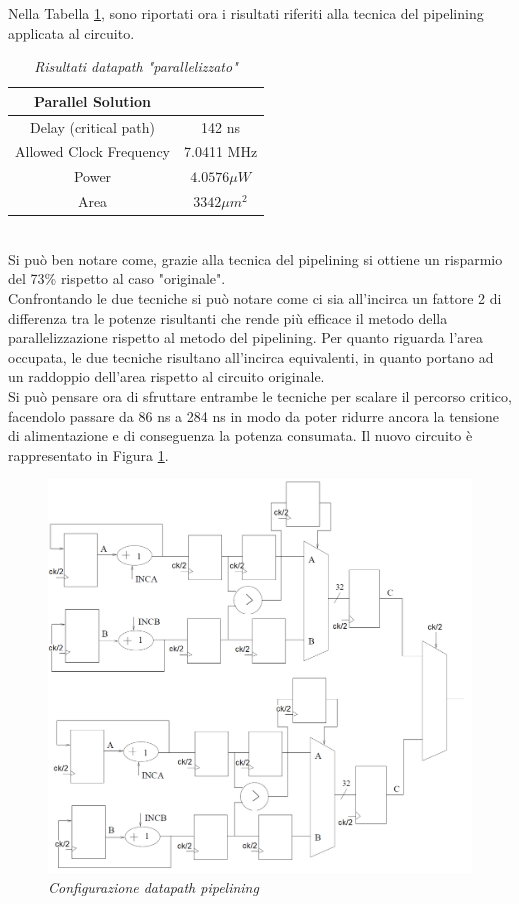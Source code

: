 Nella Tabella \ref{Tab33_6}, sono riportati ora i risultati riferiti alla tecnica del pipelining applicata al circuito.
\begin{table}[!h]\footnotesize
	\centering
	\begin{tabular}{|c|c|}
		\hline
		\textbf{Parallel Solution} & \\
		\hline
		Delay (critical path) & 142 ns\\
		Allowed Clock Frequency & 7.0411 MHz\\
		Power & $4.0576\mu W$\\
		Area & $3342 \mu m^{2}$\\
		\hline
	\end{tabular}
	\caption{\textit{Risultati datapath "parallelizzato"}}
	\label{Tab33_6}
\end{table}\\
Si può ben notare come, grazie alla tecnica del pipelining si ottiene un risparmio del 73\% rispetto al caso "originale".\\ Confrontando le due tecniche si può notare come ci sia all'incirca un fattore 2 di differenza tra le potenze risultanti che rende più efficace il metodo della parallelizzazione rispetto al metodo del pipelining. Per quanto riguarda l'area occupata, le due tecniche risultano all'incirca equivalenti, in quanto portano ad un raddoppio dell'area rispetto al circuito originale.\\
Si può pensare ora di sfruttare entrambe le tecniche per scalare il percorso critico, facendolo passare da 86 ns a 284 ns in modo da poter ridurre ancora la tensione di alimentazione e di conseguenza la potenza consumata. Il nuovo circuito è rappresentato in Figura \ref{circuito_parallel_pipe}.
\begin{figure}[!htb]
	\centering
	\includegraphics[scale=0.8]{immagini/circuito_parallel_pipe}
	\caption{\textit{Configurazione datapath pipelining}}
	\label{circuito_parallel_pipe}
\end{figure}\\
